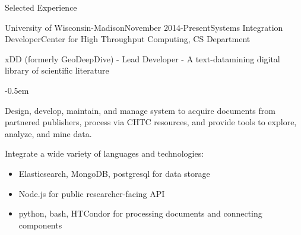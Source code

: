 \documentclass{resume} %
\begin{document}

\begin{rSection}{Selected Experience}



\begin{rSubsection}{University of Wisconsin-Madison}{November
    2014-Present}{Systems Integration Developer}{Center for High Throughput
    Computing, CS Department}
\item xDD (formerly GeoDeepDive) - Lead Developer - A text-datamining digital library of
    scientific literature
    \begin{list}{}{\leftmargin=1.5em} 
      \itemsep -0.5em \vspace{-0.5em} %
      \item Design, develop, maintain, and manage system to acquire
          documents from partnered publishers, process via CHTC resources,
          and provide tools to explore, analyze, and mine data.
      \item Integrate a wide variety of languages and technologies:
        \renewcommand\labelitemi{$\cdot$}
        \begin{itemize}{}{\leftmargin=1.25em} 
          \itemsep -0.3em \vspace{-0.3em} %
          \item Elasticsearch, MongoDB, postgresql for data storage
          \item Node.js for public researcher-facing API
          \item python, bash, HTCondor for processing documents and
          connecting components
        \end{itemize}

\end{list}
\end{rSubsection}
\end{rSection}
\end{document}
